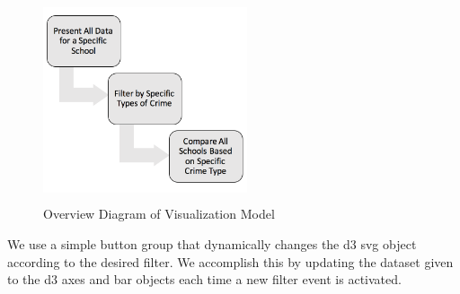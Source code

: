 \documentclass[journal]{vgtc}                %
\begin{document}
\begin{figure}[H]
\label{fig:OverviewDiagram}
\centering
\includegraphics[width=6cm, height=6cm]{method-flow-chart}
\caption{Overview Diagram of Visualization Model}
\end{figure}
We use a simple button group that dynamically changes the d3 svg object according to the desired filter. We accomplish this by updating the dataset given to the d3 axes and bar objects each time a new filter event is activated. 
\end{document}
